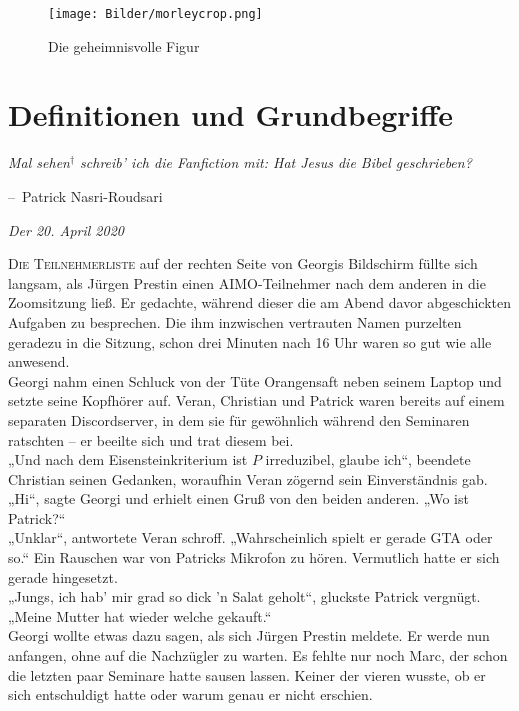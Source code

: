 \documentclass[oneside]{memoir}
\makeatletter
\newenvironment{chapquote}[2][2em]
  {\setlength{\@tempdima}{#1}%
   \def\chapquote@author{#2}%
   \parshape 1 \@tempdima \dimexpr\textwidth-2\@tempdima\relax%
   \itshape}
  {\par\normalfont\hfill--\ \chapquote@author\hspace*{\@tempdima}\par\bigskip}
\makeatother
\begin{document}
\begin{figure}[htbp] 
  \centering
     \texttt{[image: Bilder/morleycrop.png]}
  \caption{Die geheimnisvolle Figur}
\end{figure}

\chapter{Definitionen und Grundbegriffe} %
\begin{chapquote}{Patrick Nasri-Roudsari}
\glqq Mal sehen$^{\dagger}$ schreib' ich die Fanfiction mit: Hat Jesus die Bibel geschrieben?\grqq
\end{chapquote}

\textit{Der 20. April 2020}

\medskip
\lettrine{D}{ie Teilnehmerliste} auf der rechten Seite von Georgis Bildschirm füllte sich langsam, als Jürgen Prestin einen AIMO-Teilnehmer nach dem anderen in die Zoomsitzung ließ. Er gedachte, während dieser die am Abend davor abgeschickten Aufgaben zu besprechen. Die ihm inzwischen vertrauten Namen purzelten geradezu in die Sitzung, schon drei Minuten nach 16 Uhr waren so gut wie alle anwesend. \\
Georgi nahm einen Schluck von der Tüte Orangensaft neben seinem Laptop und setzte seine Kopfhörer auf. Veran, Christian und Patrick waren bereits auf einem separaten Discordserver, in dem sie für gewöhnlich während den Seminaren ratschten – er beeilte sich und trat diesem bei. \\
„Und nach dem Eisensteinkriterium ist $P$ irreduzibel, glaube ich“, beendete Christian seinen Gedanken, woraufhin Veran zögernd sein Einverständnis gab. \\
„Hi“, sagte Georgi und erhielt einen Gruß von den beiden anderen. „Wo ist Patrick?“ \\
„Unklar“, antwortete Veran schroff. „Wahrscheinlich spielt er gerade GTA oder so.“ Ein Rauschen war von Patricks Mikrofon zu hören. Vermutlich hatte er sich gerade hingesetzt. \\
„Jungs, ich hab' mir grad so dick 'n Salat geholt“, gluckste Patrick vergnügt. „Meine Mutter hat wieder welche gekauft.“ \\
Georgi wollte etwas dazu sagen, als sich Jürgen Prestin meldete. Er werde nun anfangen, ohne auf die Nachzügler zu warten. Es fehlte nur noch Marc, der schon die letzten paar Seminare hatte sausen lassen. Keiner der vieren wusste, ob er sich entschuldigt hatte oder warum genau er nicht erschien. \\
\end{document}
